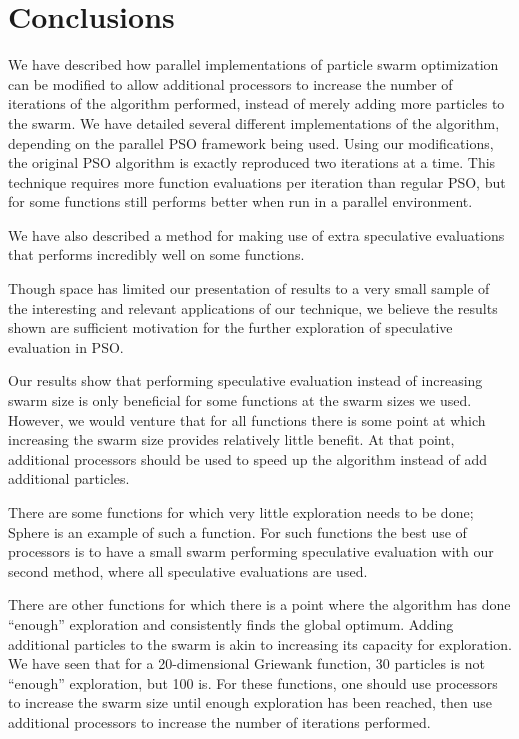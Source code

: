 \documentclass{llncs}
\begin{document}
\section{Conclusions}
\label{sec:conclusion}

We have described how parallel implementations of particle swarm optimization
can be modified to allow additional processors to increase the number of
iterations of the algorithm performed, instead of merely adding more particles
to the swarm.  We have detailed several different implementations of the
algorithm, depending on the parallel PSO framework being used.  Using our
modifications, the original PSO algorithm is exactly reproduced two iterations
at a time.  This technique requires more function evaluations per iteration
than regular PSO, but for some functions still performs better when run in a
parallel environment.

We have also described a method for making use of extra speculative evaluations
that performs incredibly well on some functions.

Though space has limited our presentation of results to a very small sample of
the interesting and relevant applications of our technique, we believe the
results shown are sufficient motivation for the further exploration of
speculative evaluation in PSO.

Our results show that performing speculative evaluation instead of increasing
swarm size is only beneficial for some functions at the swarm sizes we used.
However, we would venture that for all functions there is some point at which
increasing the swarm size provides relatively little benefit.  At that point,
additional processors should be used to speed up the algorithm instead of add
additional particles.

There are some functions for which very little exploration needs to be done;
Sphere is an example of such a function.  For such functions the best use of
processors is to have a small swarm performing speculative evaluation with our
second method, where all speculative evaluations are used.

There are other functions for which there is a point where the algorithm has
done ``enough'' exploration and consistently finds the global optimum.  Adding
additional particles to the swarm is akin to increasing its capacity for
exploration.  We have seen that for a 20-dimensional Griewank function, 30
particles is not ``enough'' exploration, but 100 is.  For these functions, one
should use processors to increase the swarm size until enough exploration has
been reached, then use additional processors to increase the number of
iterations performed.
\end{document}
